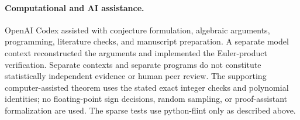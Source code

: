 \documentclass[11pt]{article}
\begin{document}
\paragraph{Computational and AI assistance.}
OpenAI Codex assisted with conjecture formulation, algebraic arguments,
programming, literature checks, and manuscript preparation. A separate
model context reconstructed the arguments and implemented the
Euler-product verification. Separate contexts and separate programs do
not constitute statistically independent evidence or human peer review.
The supporting computer-assisted theorem uses the stated exact integer
checks and polynomial identities; no floating-point sign decisions,
random sampling, or proof-assistant formalization are used. The sparse
tests use python-flint only as described above.


\small
\raggedright


\end{document}
